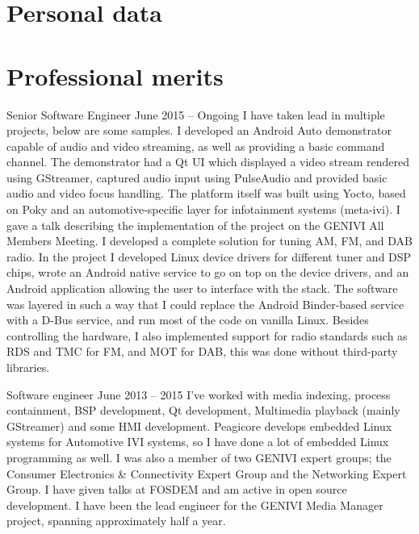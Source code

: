 \documentclass{twocolcv}
\begin{document}
\section*{Personal data}
\section*{Professional merits}
           {Senior Software Engineer}
           {June 2015 -- Ongoing}
           {
I have taken lead in multiple projects, below are some samples.\newline\newline
{}
        {I developed an Android Auto demonstrator capable of audio and video streaming, as well as providing a basic command channel. The demonstrator had a Qt UI which displayed a video stream rendered using GStreamer, captured audio input using PulseAudio and provided basic audio and video focus handling. The platform itself was built using Yocto, based on Poky and an automotive-specific layer for infotainment systems (meta-ivi). I gave a talk describing the implementation of the project on the GENIVI All Members Meeting.}
\newline\newline
{}
        {I developed a complete solution for tuning AM, FM, and DAB radio. In the project I developed Linux device drivers for different tuner and DSP chips, wrote an Android native service to go on top on the device drivers, and an Android application allowing the user to interface with the stack. The software was layered in such a way that I could replace the Android Binder-based service with a D-Bus service, and run most of the code on vanilla Linux. Besides controlling the hardware, I also implemented support for radio standards such as RDS and TMC for FM, and MOT for DAB, this was done without third-party libraries.}
}

     {Software engineer}
     {June 2013 -- 2015}
     {I've worked with media indexing, process containment, BSP development, Qt development, Multimedia playback (mainly GStreamer) and some HMI development. Peagicore develops embedded Linux systems for Automotive IVI systems, so I have done a lot of embedded Linux programming as well. I was also a member of two GENIVI expert groups; the Consumer Electronics \& Connectivity Expert Group and the Networking Expert Group. I have given talks at FOSDEM and am active in open source development. I have been the lead engineer for the GENIVI Media Manager project, spanning approximately half a year.}
\end{document}
